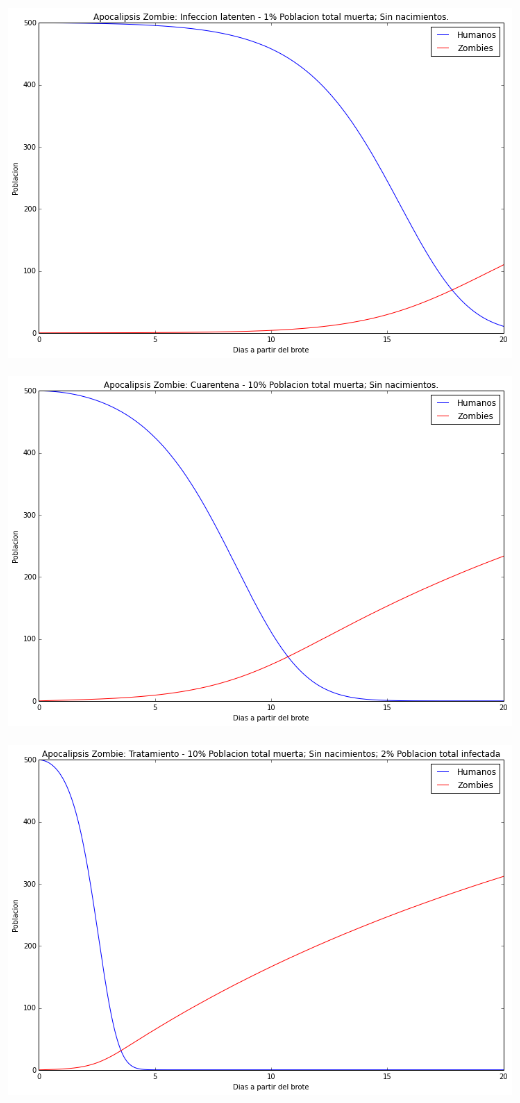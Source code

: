 \documentclass[12pt]{article}
\begin{document}
\begin{center}
\includegraphics[scale=0.5]{act11i2.png}
\end{center}

\begin{center}
\includegraphics[scale=0.5]{act11c.png}
\end{center}

\begin{center}
\includegraphics[scale=0.5]{act11t.png}
\end{center}
\pagebreak
\end{document}
